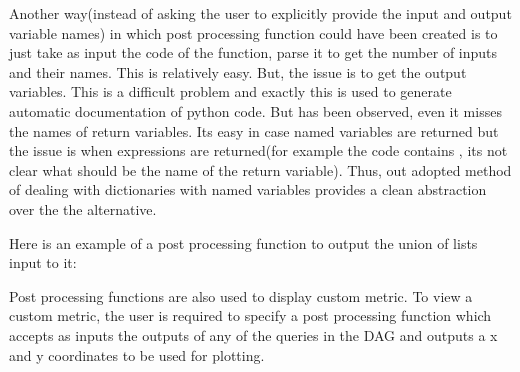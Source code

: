 \documentclass[letterpaper,10pt,english]{sphinxmanual}
\begin{document}
Another way(instead of asking the user to explicitly provide the input and output variable names) in which post processing function could have been created is to just take as input the code of the function, parse it to get the number of inputs and their names. This is relatively easy. But, the issue is to get the output variables. This is a difficult problem and exactly this is used to generate automatic documentation of python code. But has been observed, even it misses the names of return variables. Its easy in case named variables are returned but the issue is when expressions are returned(for example the code contains , its not clear what should be the name of the return variable). Thus, out adopted method of dealing with dictionaries with named variables provides a clean abstraction over the the alternative.

Here is an example of a post processing function to output the union of lists input to it:

\begin{sphinxVerbatim}[commandchars=\\\{\}]
 
      \PYG{p}{[}\PYG{p}{]}
      \PYG{p}{[}\PYG{p}{]}
       
            

      
    \PYG{p}{[}\PYG{p}{]}  
     
\end{sphinxVerbatim}

Post processing functions are also used to display custom metric. To view a custom metric, the user is required to specify a post processing function which accepts as inputs the outputs of any of the queries in the DAG and outputs a x and y coordinates to be used for plotting.
\end{document}
